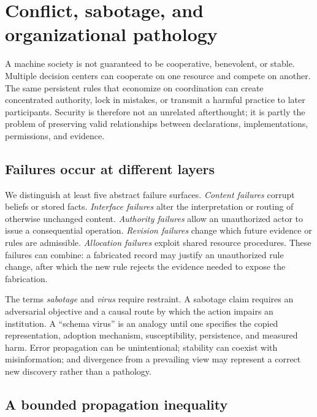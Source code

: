 \documentclass[11pt,letterpaper]{article}
\theoremstyle{plain}
\theoremstyle{definition}
\theoremstyle{remark}
\begin{document}
\section{Conflict, sabotage, and organizational pathology}\label{sec:security}

A machine society is not guaranteed to be cooperative, benevolent, or stable. Multiple decision centers can cooperate on one resource and compete on another. The same persistent rules that economize on coordination can create concentrated authority, lock in mistakes, or transmit a harmful practice to later participants. Security is therefore not an unrelated afterthought; it is partly the problem of preserving valid relationships between declarations, implementations, permissions, and evidence.

\subsection{Failures occur at different layers}

We distinguish at least five abstract failure surfaces. \emph{Content failures} corrupt beliefs or stored facts. \emph{Interface failures} alter the interpretation or routing of otherwise unchanged content. \emph{Authority failures} allow an unauthorized actor to issue a consequential operation. \emph{Revision failures} change which future evidence or rules are admissible. \emph{Allocation failures} exploit shared resource procedures. These failures can combine: a fabricated record may justify an unauthorized rule change, after which the new rule rejects the evidence needed to expose the fabrication.

The terms \emph{sabotage} and \emph{virus} require restraint. A sabotage claim requires an adversarial objective and a causal route by which the action impairs an institution. A ``schema virus'' is an analogy until one specifies the copied representation, adoption mechanism, susceptibility, persistence, and measured harm. Error propagation can be unintentional; stability can coexist with misinformation; and divergence from a prevailing view may represent a correct new discovery rather than a pathology.

\subsection{A bounded propagation inequality}
\end{document}
